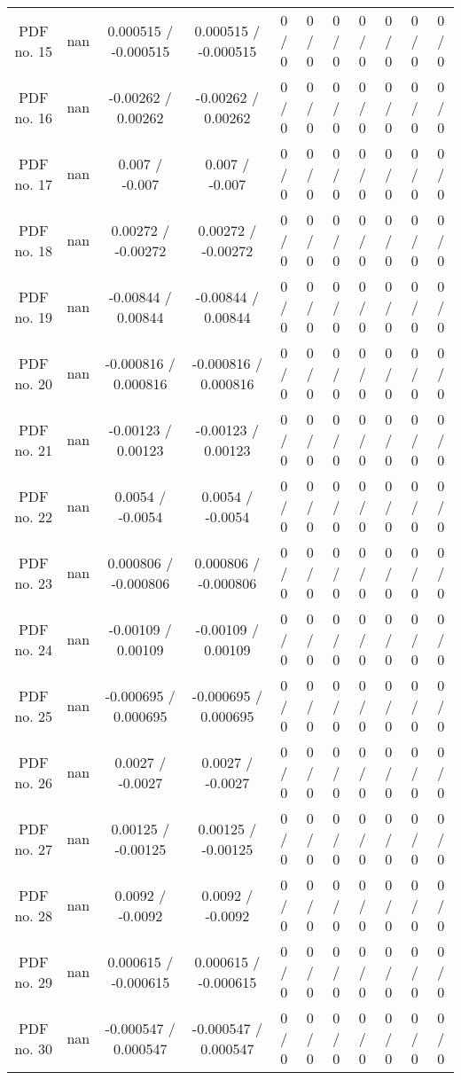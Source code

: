 \begin{table}[htbp]
\begin{center}
\begin{tabular}{|c|c|c|c|c|c|c|c|c|c|c|}
  PDF no. 15 &    nan    & 0.000515 / -0.000515 & 0.000515 / -0.000515 & 0 / 0 & 0 / 0 & 0 / 0 & 0 / 0 & 0 / 0 & 0 / 0 & 0 / 0 \\ 
  PDF no. 16 &    nan    & -0.00262 / 0.00262 & -0.00262 / 0.00262 & 0 / 0 & 0 / 0 & 0 / 0 & 0 / 0 & 0 / 0 & 0 / 0 & 0 / 0 \\ 
  PDF no. 17 &    nan    & 0.007 / -0.007 & 0.007 / -0.007 & 0 / 0 & 0 / 0 & 0 / 0 & 0 / 0 & 0 / 0 & 0 / 0 & 0 / 0 \\ 
  PDF no. 18 &    nan    & 0.00272 / -0.00272 & 0.00272 / -0.00272 & 0 / 0 & 0 / 0 & 0 / 0 & 0 / 0 & 0 / 0 & 0 / 0 & 0 / 0 \\ 
  PDF no. 19 &    nan    & -0.00844 / 0.00844 & -0.00844 / 0.00844 & 0 / 0 & 0 / 0 & 0 / 0 & 0 / 0 & 0 / 0 & 0 / 0 & 0 / 0 \\ 
  PDF no. 20 &    nan    & -0.000816 / 0.000816 & -0.000816 / 0.000816 & 0 / 0 & 0 / 0 & 0 / 0 & 0 / 0 & 0 / 0 & 0 / 0 & 0 / 0 \\ 
  PDF no. 21 &    nan    & -0.00123 / 0.00123 & -0.00123 / 0.00123 & 0 / 0 & 0 / 0 & 0 / 0 & 0 / 0 & 0 / 0 & 0 / 0 & 0 / 0 \\ 
  PDF no. 22 &    nan    & 0.0054 / -0.0054 & 0.0054 / -0.0054 & 0 / 0 & 0 / 0 & 0 / 0 & 0 / 0 & 0 / 0 & 0 / 0 & 0 / 0 \\ 
  PDF no. 23 &    nan    & 0.000806 / -0.000806 & 0.000806 / -0.000806 & 0 / 0 & 0 / 0 & 0 / 0 & 0 / 0 & 0 / 0 & 0 / 0 & 0 / 0 \\ 
  PDF no. 24 &    nan    & -0.00109 / 0.00109 & -0.00109 / 0.00109 & 0 / 0 & 0 / 0 & 0 / 0 & 0 / 0 & 0 / 0 & 0 / 0 & 0 / 0 \\ 
  PDF no. 25 &    nan    & -0.000695 / 0.000695 & -0.000695 / 0.000695 & 0 / 0 & 0 / 0 & 0 / 0 & 0 / 0 & 0 / 0 & 0 / 0 & 0 / 0 \\ 
  PDF no. 26 &    nan    & 0.0027 / -0.0027 & 0.0027 / -0.0027 & 0 / 0 & 0 / 0 & 0 / 0 & 0 / 0 & 0 / 0 & 0 / 0 & 0 / 0 \\ 
  PDF no. 27 &    nan    & 0.00125 / -0.00125 & 0.00125 / -0.00125 & 0 / 0 & 0 / 0 & 0 / 0 & 0 / 0 & 0 / 0 & 0 / 0 & 0 / 0 \\ 
  PDF no. 28 &    nan    & 0.0092 / -0.0092 & 0.0092 / -0.0092 & 0 / 0 & 0 / 0 & 0 / 0 & 0 / 0 & 0 / 0 & 0 / 0 & 0 / 0 \\ 
  PDF no. 29 &    nan    & 0.000615 / -0.000615 & 0.000615 / -0.000615 & 0 / 0 & 0 / 0 & 0 / 0 & 0 / 0 & 0 / 0 & 0 / 0 & 0 / 0 \\ 
  PDF no. 30 &    nan    & -0.000547 / 0.000547 & -0.000547 / 0.000547 & 0 / 0 & 0 / 0 & 0 / 0 & 0 / 0 & 0 / 0 & 0 / 0 & 0 / 0 \\ 

\end{tabular}
\end{center}
\end{table}
